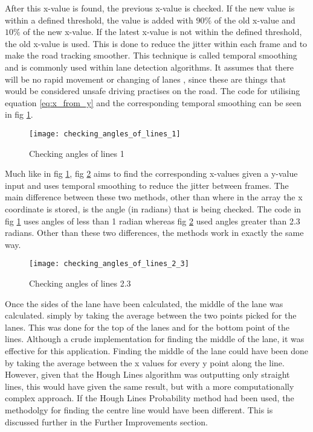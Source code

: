 \documentclass[conference]{IEEEtran}
\begin{document}
After this x-value is found, the previous x-value is checked. If the new value is within a defined threshold, the value is added with $90\%$ of the old x-value and $10\%$ of the new x-value. If the latest x-value is not within the defined threshold, the old x-value is used. This is done to reduce the jitter within each frame and to make the road tracking smoother. This technique is called temporal smoothing \cite{temporal_smoothing} and is commonly used within lane detection algorithms. It assumes that there will be no rapid movement or changing of lanes \cite{deeplane}, since these are things that would be considered unsafe driving practises on the road. The code for utilising equation \ref{eq:x_from_y} and the corresponding temporal smoothing can be seen in fig \ref{fig:checking_angles_of_lines_1}.

\begin{figure}[H]
\centerline{\texttt{[image: checking\_angles\_of\_lines\_1]}}
\caption{Checking angles of lines 1}
\label{fig:checking_angles_of_lines_1}
\end{figure}

Much like in fig \ref{fig:checking_angles_of_lines_1}, fig \ref{fig:checking_angles_of_lines_2.3} aims to find the corresponding x-values given a y-value input and uses temporal smoothing to reduce the jitter between frames. The main difference between these two methods, other than where in the array the x coordinate is stored, is the angle (in radians) that is being checked. The code in fig \ref{fig:checking_angles_of_lines_1} uses angles of less than 1 radian whereas fig \ref{fig:checking_angles_of_lines_2.3} used angles greater than 2.3 radians. Other than these two differences, the methods work in exactly the same way. 

\begin{figure}[H]
\centerline{\texttt{[image: checking\_angles\_of\_lines\_2\_3]}}
\caption{Checking angles of lines 2.3}
\label{fig:checking_angles_of_lines_2.3}
\end{figure}

Once the sides of the lane have been calculated, the middle of the lane was calculated. simply by taking the average between the two points picked for the lanes. This was done for the top of the lanes and for the bottom point of the lines. Although a crude implementation for finding the middle of the lane, it was effective for this application. Finding the middle of the lane could have been done by taking the average between the x values for every y point along the line. However, given that the Hough Lines algorithm was outputting only straight lines, this would have given the same result, but with a more computationally complex approach. If the Hough Lines Probability method had been used, the methodolgy for finding the centre line would have been different. This is discussed further in the Further Improvements section. 
\end{document}

